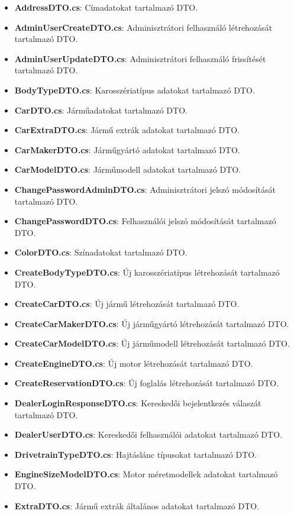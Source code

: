 \documentclass{report}[11pt]
\begin{document}
\begin{itemize}
    \item \textbf{AddressDTO.cs}: Címadatokat tartalmazó DTO.
    \item \textbf{AdminUserCreateDTO.cs}: Adminisztrátori felhasználó létrehozását tartalmazó DTO.
    \item \textbf{AdminUserUpdateDTO.cs}: Adminisztrátori felhasználó frissítését tartalmazó DTO.
    \item \textbf{BodyTypeDTO.cs}: Karosszériatípus adatokat tartalmazó DTO.
    \item \textbf{CarDTO.cs}: Járműadatokat tartalmazó DTO.
    \item \textbf{CarExtraDTO.cs}: Jármű extrák adatokat tartalmazó DTO.
    \item \textbf{CarMakerDTO.cs}: Járműgyártó adatokat tartalmazó DTO.
    \item \textbf{CarModelDTO.cs}: Járműmodell adatokat tartalmazó DTO.
    \item \textbf{ChangePasswordAdminDTO.cs}: Adminisztrátori jelszó módosítását tartalmazó DTO.
    \item \textbf{ChangePasswordDTO.cs}: Felhasználói jelszó módosítását tartalmazó DTO.
    \item \textbf{ColorDTO.cs}: Színadatokat tartalmazó DTO.
    \item \textbf{CreateBodyTypeDTO.cs}: Új karosszériatípus létrehozását tartalmazó DTO.
    \item \textbf{CreateCarDTO.cs}: Új jármű létrehozását tartalmazó DTO.
    \item \textbf{CreateCarMakerDTO.cs}: Új járműgyártó létrehozását tartalmazó DTO.
    \item \textbf{CreateCarModelDTO.cs}: Új járműmodell létrehozását tartalmazó DTO.
    \item \textbf{CreateEngineDTO.cs}: Új motor létrehozását tartalmazó DTO.
    \item \textbf{CreateReservationDTO.cs}: Új foglalás létrehozását tartalmazó DTO.
    \item \textbf{DealerLoginResponseDTO.cs}: Kereskedői bejelentkezés válaszát tartalmazó DTO.
    \item \textbf{DealerUserDTO.cs}: Kereskedői felhasználói adatokat tartalmazó DTO.
    \item \textbf{DrivetrainTypeDTO.cs}: Hajtáslánc típusokat tartalmazó DTO.
    \item \textbf{EngineSizeModelDTO.cs}: Motor méretmodellek adatokat tartalmazó DTO.
    \item \textbf{ExtraDTO.cs}: Jármű extrák általános adatokat tartalmazó DTO.

\end{itemize}
\end{document}
